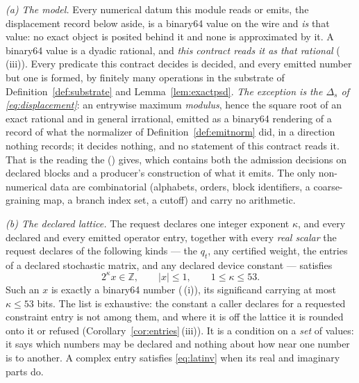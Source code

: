 \begin{definition}\label{def:exactadm}
\emph{(a) The model.} Every numerical datum this module reads or emits,
the displacement record below aside, is a binary64 value on the wire and
\emph{is} that value: no exact object is posited behind it and none is
approximated by it. A binary64 value is a dyadic
rational, and \emph{this contract reads it as that rational}
(\,(iii)). Every predicate this contract
decides is decided, and every emitted number but one is formed, by finitely
many operations in the substrate of Definition~\ref{def:substrate} and
Lemma~\ref{lem:exactpsd}. \emph{The exception is the 
$\Delta_s$ of \eqref{eq:displacement}}: an entrywise maximum \emph{modulus},
hence the square root of an exact rational and in general irrational, emitted
as a binary64 rendering of a record of what the normalizer of
Definition~\ref{def:emitnorm} did, in a direction nothing records; it decides
nothing, and no statement of this contract reads it. That is the reading the
 () gives, which
contains both the admission decisions on declared blocks and a producer's
construction of what it emits. The only non-numerical data are combinatorial
(alphabets, orders, block identifiers, a coarse-graining map, a branch index
set, a cutoff) and carry no arithmetic.

\emph{(b) The declared lattice.} The request declares one integer exponent
$\kappa$, and every declared and every emitted operator entry, together with
every \emph{real scalar} the request declares of the following kinds --- the
 $q_t$, any certified weight, the entries of a declared
stochastic matrix, and any declared device constant --- satisfies
\begin{equation}\label{eq:latinv}
  2^{\kappa}x\in\mathbb{Z},
  \qquad |x|\le1,
  \qquad 1\le\kappa\le53 .
\end{equation}
Such an $x$ is exactly a binary64 number
(\,(i)), its significand carrying at
most $\kappa\le53$ bits. The list is exhaustive: the constant a caller declares for a
requested constraint entry is not among them, and where it is off the
lattice it is rounded onto it or refused (Corollary~\ref{cor:entries}\,(iii)). It is a condition on a \emph{set} of values: it says which numbers
may be declared and nothing about how near one number is to another. A
complex entry satisfies \eqref{eq:latinv} when its real and imaginary parts
do.


\end{definition}
